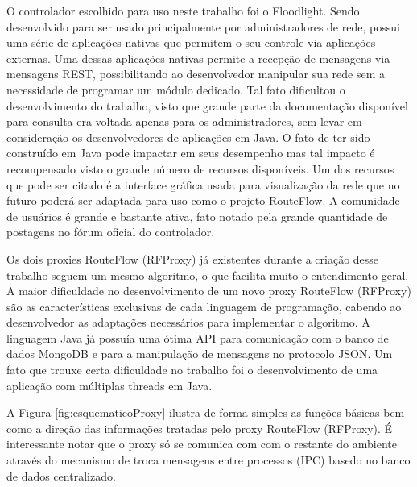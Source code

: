 O controlador escolhido para uso neste trabalho foi 
o Floodlight. Sendo desenvolvido para ser usado
principalmente por  administradores de rede, possui uma 
série de aplicações nativas que permitem o seu controle
via aplicações externas. Uma dessas aplicações nativas 
permite a recepção de mensagens via mensagens REST,
possibilitando ao desenvolvedor manipular sua rede sem
a necessidade de programar um módulo dedicado. Tal fato
dificultou o desenvolvimento do trabalho, visto que grande 
parte da documentação disponível para consulta era voltada
apenas para os administradores, sem levar em consideração os 
desenvolvedores de aplicações em Java. O fato
de ter sido construído em Java pode impactar em seus desempenho
mas tal impacto é recompensado visto o grande número de 
recursos disponíveis. Um dos recursos que pode ser citado
é a interface gráfica usada para visualização da rede que
no futuro poderá ser adaptada para uso como o projeto 
RouteFlow. A comunidade de usuários é grande e bastante
ativa, fato notado pela grande quantidade de postagens no
fórum oficial do controlador.

Os dois proxies RouteFlow (RFProxy) já existentes durante a 
criação desse trabalho seguem um mesmo algoritmo, o que 
facilita muito o entendimento geral. A maior dificuldade no
desenvolvimento de um novo proxy RouteFlow (RFProxy) são
as características exclusivas de cada linguagem de programação,
cabendo ao desenvolvedor as adaptações necessários para 
implementar o algoritmo. A linguagem Java já possuía uma
ótima API para comunicação com o banco de dados MongoDB
e para a manipulação de mensagens no protocolo JSON. Um fato
que trouxe certa dificuldade no trabalho foi o desenvolvimento
de uma aplicação com múltiplas threads em Java. 

A Figura \ref{fig:esquematicoProxy} ilustra de forma simples as
funções básicas bem como a direção das informações tratadas
pelo proxy RouteFlow (RFProxy). É interessante notar que o 
proxy só se comunica com com o restante do ambiente através
do mecanismo de troca mensagens entre processos (IPC) basedo
no banco de dados centralizado.
\newline
\newline
\newline
\newline


